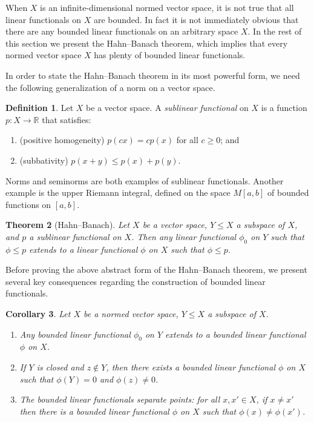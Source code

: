 \documentclass[11pt,oneside]{amsbook}
\newcommand{\RR}{{\mathbb R}}
\theoremstyle{definition}
\theoremstyle{plain}
\newtheorem{thm}{Theorem}[section]
\newtheorem{cor}[thm]{Corollary}
\theoremstyle{definition}
\newtheorem{defn}[thm]{Definition}
\theoremstyle{remark}
\numberwithin{equation}{section}
\numberwithin{figure}{section}
\begin{document}
When $X$ is an infinite-dimensional normed vector space, it is not true that all linear functionals on $X$ are bounded. In fact it is not immediately obvious that there are any bounded linear functionals on an arbitrary space $X$. In the rest of this section we present the Hahn--Banach theorem, which implies that every normed vector space $X$ has plenty of bounded linear functionals.

In order to state the Hahn--Banach theorem in its most powerful form, we need the following generalization of a norm on a vector space.

\begin{defn}
  Let $X$ be a vector space. A \emph{sublinear functional} on $X$ is a function $p\colon X\to\RR$ that satisfies:
  \begin{enumerate}
  \item (positive homogeneity) $p(cx)=cp(x)$ for all $c\geq0$; and
  \item (subbativity) $p(x+y)\leq p(x)+p(y)$.
  \end{enumerate}
\end{defn}

Norms and seminorms are both examples of sublinear functionals. Another example is the upper Riemann integral, defined on the space $M[a,b]$ of bounded functions on $[a,b]$.

\begin{thm}[Hahn--Banach]
  \label{thm:hb}
  Let $X$ be a vector space, $Y\leq X$ a subspace of $X$, and $p$ a sublinear functional on $X$. Then any linear functional $\phi_0$ on $Y$ such that $\phi\leq p$ extends to a linear functional $\phi$ on $X$ such that $\phi\leq p$.
\end{thm}

Before proving the above abstract form of the Hahn--Banach theorem, we present several key consequences regarding the construction of bounded linear functionals.

\begin{cor}
  \label{cor:hb}
  Let $X$ be a normed vector space, $Y\leq X$ a subspace of $X$.
  \begin{enumerate}
  \item Any bounded linear functional $\phi_0$ on $Y$ extends to a bounded linear functional $\phi$ on $X$.
  \item If $Y$ is closed and $z\notin Y$, then there exists a bounded linear functional $\phi$ on $X$ such that $\phi(Y)=0$ and $\phi(z)\neq0$.
  \item The bounded linear functionals separate points: for all $x,x'\in X$, if $x\neq x'$ then there is a bounded linear functional $\phi$ on $X$ such that $\phi(x)\neq\phi(x')$.
  \end{enumerate}
\end{cor}
\end{document}
